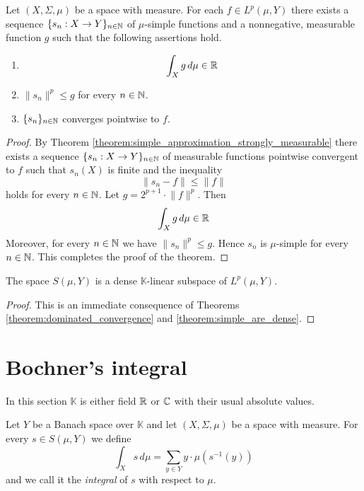 \documentclass[10pt]{amsart}
\begin{document}
\begin{theorem}\label{theorem:simple_are_dense}
	Let $(X,\Sigma, \mu)$ be a space with measure. For each $f \in L^p(\mu,Y)$ there exists a sequence $\{s_n:X\rightarrow Y\}_{n\in {\mathbb N}}$ of $\mu$-simple functions and a nonnegative, measurable function $g$ such that the following assertions hold.
	\begin{enumerate}[label=\emph{\textbf{(\arabic*)}}, leftmargin=*]
		\item
		      $$\int_Xg\,d\mu \in {\mathbb R}$$
		\item $\lVert s_n \rVert^p \leq g$ for every $n\in {\mathbb N}$.
		\item $\{s_n\}_{n\in {\mathbb N}}$ converges pointwise to $f$.
	\end{enumerate}
\end{theorem}
\begin{proof}
	By Theorem \ref{theorem:simple_approximation_strongly_measurable} there exists a sequence $\{s_n:X\rightarrow Y\}_{n\in {\mathbb N}}$ of measurable functions pointwise convergent to $f$ such that $s_n(X)$ is finite and the inequality
	$$\lVert s_n - f\rVert\leq \lVert f\rVert$$
	holds for every $n\in {\mathbb N}$. Let $g = 2^{p+1} \cdot \lVert f\rVert^p$. Then
	$$\int_Xg\,d\mu \in {\mathbb R}$$
	Moreover, for every $n\in {\mathbb N}$ we have $\lVert s_n \rVert^p \leq g$. Hence $s_n$ is $\mu$-simple for every $n\in {\mathbb N}$. This completes the proof of the  theorem.
\end{proof}

\begin{corollary}\label{corollary:simple_are_dense}
	The space $S(\mu, Y)$ is a dense $\mathbb{K}$-linear subspace of $L^p(\mu, Y)$.
\end{corollary}
\begin{proof}
	This is an immediate consequence of Theorems \ref{theorem:dominated_convergence} and \ref{theorem:simple_are_dense}.
\end{proof}

\section{Bochner's integral}\label{section:bochner_integration}
\noindent
In this section $\mathbb{K}$ is either field ${\mathbb R}$ or ${\mathbb C}$ with their usual absolute values.

\begin{definition}
	Let $Y$ be a Banach space over $\mathbb{K}$ and let $(X,\Sigma,\mu)$ be a space with measure. For every $s \in S(\mu, Y)$ we define
	$$\int_X s\,d\mu = \sum_{y\in Y}y\cdot \mu\left(s^{-1}(y)\right)$$
and we call it the \textit{integral} of $s$ with respect to $\mu$.
\end{definition}
\end{document}
